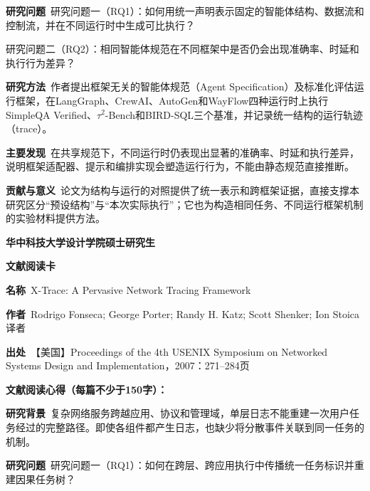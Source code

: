 \noindent\textbf{研究问题}\ 研究问题一（RQ1）：如何用统一声明表示固定的智能体结构、数据流和控制流，并在不同运行时中生成可比执行？\par
研究问题二（RQ2）：相同智能体规范在不同框架中是否仍会出现准确率、时延和执行行为差异？\par
\noindent\textbf{研究方法}\ 作者提出框架无关的智能体规范（Agent Specification）及标准化评估运行框架，在LangGraph、CrewAI、AutoGen和WayFlow四种运行时上执行SimpleQA Verified、$\tau^2$-Bench和BIRD-SQL三个基准，并记录统一结构的运行轨迹（trace）。\par
\noindent\textbf{主要发现}\ 在共享规范下，不同运行时仍表现出显著的准确率、时延和执行差异，说明框架适配器、提示和编排实现会塑造运行行为，不能由静态规范直接推断。\par
\noindent\textbf{贡献与意义}\ 论文为结构与运行的对照提供了统一表示和跨框架证据，直接支撑本研究区分“预设结构”与“本次实际执行”；它也为构造相同任务、不同运行框架机制的实验材料提供方法。\par
\clearpage
\begin{center}
{\songti\bfseries\fontsize{18.5pt}{27.75pt}\selectfont 华中科技大学设计学院硕士研究生\par}
{\songti\bfseries\fontsize{18.5pt}{27.75pt}\selectfont 文献阅读卡\par}
\end{center}
\vspace{0.25em}
\noindent\underline{}\par
\vspace{0.35em}
\noindent\textbf{名称}\ X-Trace: A Pervasive Network Tracing Framework\par
\noindent\textbf{作者}\ Rodrigo Fonseca; George Porter; Randy H. Katz; Scott Shenker; Ion Stoica\quad 译者\par
\noindent\textbf{出处}\ 【美国】Proceedings of the 4th USENIX Symposium on Networked Systems Design and Implementation，2007：271–284\quad 页\par
\vspace{0.35em}
\noindent\textbf{文献阅读心得（每篇不少于150字）：}\par
\noindent\textbf{研究背景}\ 复杂网络服务跨越应用、协议和管理域，单层日志不能重建一次用户任务经过的完整路径。即使各组件都产生日志，也缺少将分散事件关联到同一任务的机制。\par
\noindent\textbf{研究问题}\ 研究问题一（RQ1）：如何在跨层、跨应用执行中传播统一任务标识并重建因果任务树？\par
